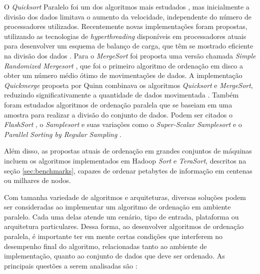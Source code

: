 O \textit{Quicksort} Paralelo foi um dos algoritmos mais estudados \cite{Deminet:1982, Quinn:1994, Sanders:1997}, mas inicialmente a divisão dos dados limitava o aumento da velocidade, independente do número de processadores utilizados. Recentemente novas implementações foram propostas, utilizando as tecnologias  de \textit{hyperthreading} disponíveis em processadores atuais para desenvolver um esquema de balanço de carga, que têm se mostrado eficiente na divisão dos dados \cite{Parikh:2008}.
Para o \textit{MergeSort} foi proposta uma versão chamada \textit{Simple Randomized Mergesort} \cite{Barve:1996, Barve:2002}, que foi o primeiro algoritmo de ordenação em disco a obter um número médio ótimo de movimentações de dados. 
 A implementação \textit{Quickmerge} proposta por Quinn combinava os algoritmos \textit{Quicksort} e \textit{MergeSort}, reduzindo significativamente a quantidade de dados movimentada \cite{Quinn:1988}. Também foram estudados algoritmos de ordenação paralela que se baseiam em uma amostra para realizar a divisão do conjunto de dados. Podem ser citados o \textit{FlashSort} \cite{Reif:1987}, o \textit{Samplesort} \cite{Huang:1983} e suas variações como o \textit{Super-Scalar Samplesort }\cite{Sanders:2004} e o \textit{Parallel Sorting by Regular Sampling} \cite{Shi:1992}.

Além disso, as propostas atuais de ordenação em grandes conjuntos de máquinas incluem os algoritmos implementados em Hadoop \textit{Sort} e \textit{TeraSort}, descritos na seção \ref{sec:benchmarks}, capazes de ordenar petabytes de informação em centenas ou milhares de nodos. 



Com tamanha variedade de algoritmos e arquiteturas, diversas soluções podem ser consideradas ao implementar um algoritmo de ordenação em ambiente paralelo. Cada uma delas atende um cenário, tipo de entrada, plataforma ou arquitetura particulares. Dessa forma, ao desenvolver algoritmos de ordenação paralela, é importante ter em mente certas condições que interferem no desempenho final do algoritmo, relacionadas tanto ao ambiente de implementação, quanto ao conjunto de dados que deve ser ordenado. As principais questões a serem analisadas são \cite{Kale:2010}:

